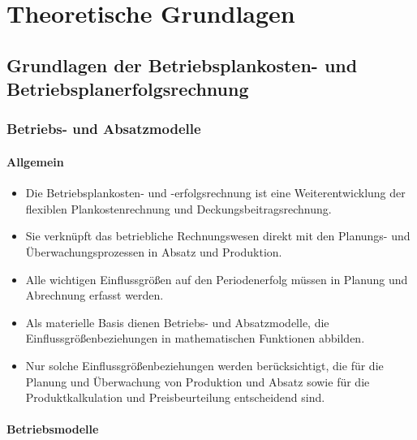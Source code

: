 \chapter{Theoretische Grundlagen}

\section{Grundlagen der Betriebsplankosten- und Betriebsplanerfolgsrechnung}

\subsection{Betriebs- und Absatzmodelle}

\subsubsection{Allgemein}

\begin{itemize}
    \item Die Betriebsplankosten- und -erfolgsrechnung ist eine Weiterentwicklung der flexiblen Plankostenrechnung und Deckungsbeitragsrechnung.
    \item Sie verknüpft das betriebliche Rechnungswesen direkt mit den Planungs- und Überwachungsprozessen in Absatz und Produktion.
    \item Alle wichtigen Einflussgrö{\ss}en auf den Periodenerfolg müssen in Planung und Abrechnung erfasst werden.
    \item Als materielle Basis dienen Betriebs- und Absatzmodelle, die Einflussgrö{\ss}enbeziehungen in mathematischen Funktionen abbilden.
    \item Nur solche Einflussgrö{\ss}enbeziehungen werden berücksichtigt, die für die Planung und Überwachung von Produktion und Absatz sowie für die Produktkalkulation und Preisbeurteilung entscheidend sind.
\end{itemize}

\subsubsection{Betriebsmodelle}


